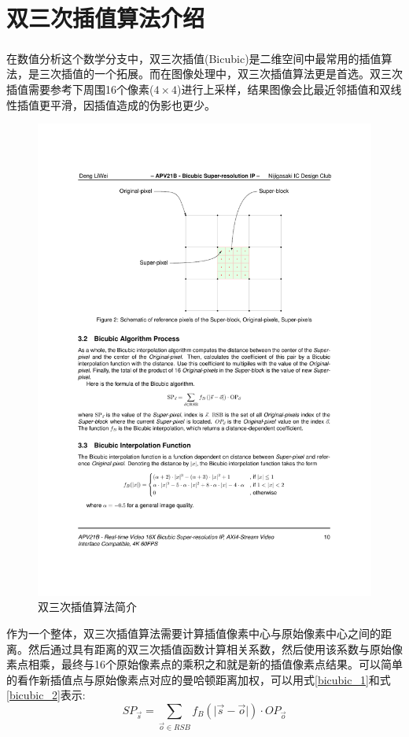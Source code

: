 \documentclass[12pt, a4paper, oneside]{ctexbook}
\begin{document}
	\section{双三次插值算法介绍}
	在数值分析这个数学分支中，双三次插值(Bicubic)\textsuperscript{\cite{10}\cite{11}}是二维空间中最常用的插值算法，是三次插值的一个拓展。而在图像处理中，双三次插值算法更是首选。双三次插值需要参考下周围16个像素($4 \times 4$)进行上采样，结果图像会比最近邻插值和双线性插值更平滑，因插值造成的伪影也更少。
		\begin{figure}[h]
			\centering
			\includegraphics[scale=1]{./pic/bicubic-introduction.pdf}
			\caption{双三次插值算法简介}
			\label{bicubic_introduction}
		\end{figure}
	\par
	作为一个整体，双三次插值算法需要计算插值像素中心与原始像素中心之间的距离。然后通过具有距离的双三次插值函数计算相关系数，然后使用该系数与原始像素点相乘，最终与16个原始像素点的乘积之和就是新的插值像素点结果。可以简单的看作新插值点与原始像素点对应的曼哈顿距离加权，可以用式\ref{bicubic_1}和式\ref{bicubic_2}表示:
	\begin{equation}
	SP_{\vec{s}}=\sum_{\vec{o}\in{RSB}}f_B(\vert\vec{s}-\vec{o}\vert)\cdot OP_{\vec{o}}		
	\label{bicubic_1}
	\end{equation}	
\end{document}
